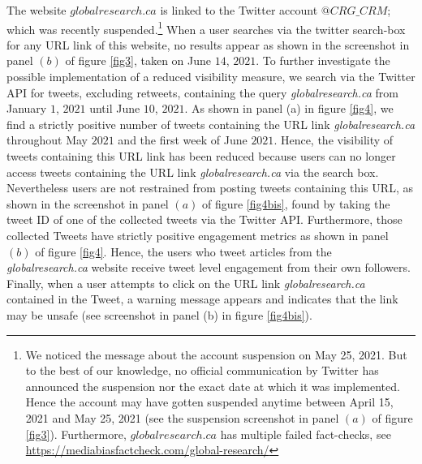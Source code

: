 \documentclass{article}
\begin{document}
The website $globalresearch.ca$ is linked to the Twitter account {$@CRG\_CRM$}; which was recently suspended.\footnote{We noticed the message about the account suspension on May 25, 2021. But to the best of our knowledge, no official communication by Twitter has announced the suspension nor the exact date at which it was implemented. Hence the account may have gotten suspended anytime between April 15, 2021 and May 25, 2021 (see the suspension screenshot in panel $(a)$ of figure \ref{fig3}). Furthermore, $globalresearch.ca$ has multiple failed fact-checks, see \href{https://mediabiasfactcheck.com/global-research/}{https://mediabiasfactcheck.com/global-research/}} When a user searches via the twitter search-box for any URL link of this website, no results appear as shown in the screenshot in panel $(b)$ of figure \ref{fig3}, taken on June $14$, $2021$. To further investigate the possible implementation of a reduced visibility measure, we search via the Twitter API for tweets, excluding retweets, containing the query {\it globalresearch.ca} from January $1$, $2021$ until June $10$, $2021$.  As shown in panel (a) in figure \ref{fig4}, we find a strictly positive number of tweets containing the URL link {\it globalresearch.ca} throughout May $2021$ and the first week of June $2021$. Hence, the visibility of tweets containing this URL link has been reduced because users can no longer access tweets containing the URL link {\it globalresearch.ca} via the search box. Nevertheless users are not restrained from posting tweets containing this URL, as shown in the screenshot in panel $(a)$ of figure \ref{fig4bis}, found by taking the tweet ID of one of the collected tweets via the Twitter API. Furthermore, those collected Tweets have strictly positive engagement metrics as shown in panel $(b)$ of figure \ref{fig4}. Hence, the users who tweet articles from the {\it globalresearch.ca} website receive tweet level engagement from their own followers. Finally, when a user attempts to click on the URL link {\it globalresearch.ca} contained in the Tweet, a warning message appears and indicates that the link may be unsafe (see screenshot in panel (b) in figure \ref{fig4bis}). 
\end{document}
